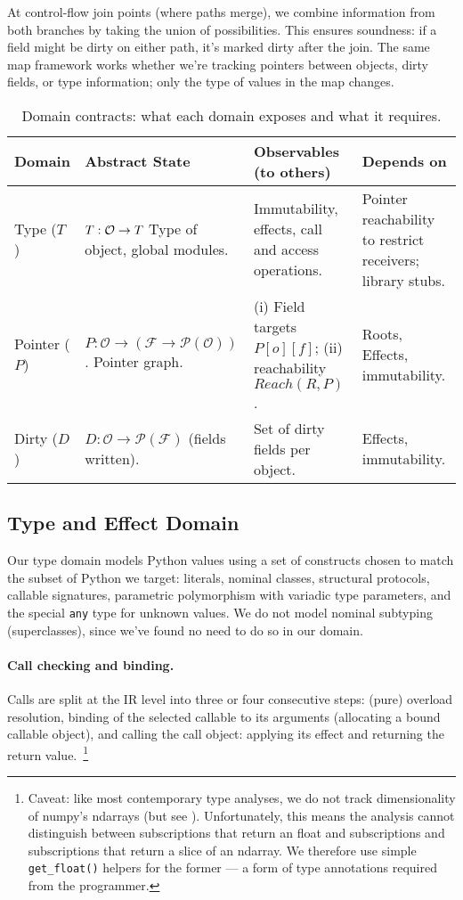 At control-flow join points (where paths merge), we combine information from both branches by taking the union of possibilities. This ensures soundness: if a field might be dirty on either path, it's marked dirty after the join. The same map framework works whether we're tracking pointers between objects, dirty fields, or type information; only the type of values in the map changes.

\begin{table}[t]
\centering
\small
\begin{tabular}{p{15mm}p{36mm}p{37mm}p{40mm}}
\toprule
\textbf{Domain} & \textbf{Abstract State} & \textbf{Observables (to others)} & \textbf{Depends on} \\
\midrule
Type ($T$) &
  $T:\mathcal O\to \mathcal \mathcal{T}$
  Type of object, global modules. &
  Immutability, effects, call and access operations. &
  Pointer reachability to restrict receivers; library stubs. \\
\addlinespace
Pointer ($P$) &
  $P:\mathcal O\to(\mathcal F\to \mathcal P(\mathcal O))$.
  Pointer graph.&
  (i) Field targets $P[o][f]$; (ii) reachability $Reach(R,P)$. &
  Roots, Effects, immutability. \\
\addlinespace
Dirty ($D$) &
  $D:\mathcal O\to \mathcal P(\mathcal F)$ (fields written). &
  Set of dirty fields per object. &
  Effects,  immutability. \\
\bottomrule
\end{tabular}
\caption{Domain contracts: what each domain exposes and what it requires.}
\label{tab:contracts}
\end{table}

\subsection{Type and Effect Domain}
Our type domain models Python values using a set of constructs chosen to match the subset of Python we target: literals, nominal classes, structural protocols, callable signatures, parametric polymorphism with variadic type parameters, and the special \texttt{any} type for unknown values. We do not model nominal subtyping (superclasses), since we've found no need to do so in our domain.

\paragraph{Call checking and binding.}
Calls are split at the IR level into three or four consecutive steps: (pure) overload resolution, binding of the selected callable to its arguments (allocating a bound callable object), and calling the call object: applying its effect and returning the return value.~\footnote{Caveat: like most contemporary type analyses, we do not track dimensionality of numpy's ndarrays (but see \cite{liu2020type}). Unfortunately, this means the analysis cannot distinguish between subscriptions that return an float and subscriptions and subscriptions that return a slice of an ndarray. We therefore use simple \texttt{get\_float()} helpers for the former --- a form of type annotations required from the programmer.}

